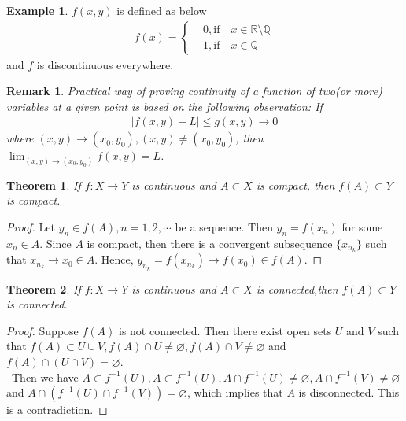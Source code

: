 \documentclass[12pt,leqno]{amsart}
\newtheorem{theorem}{Theorem}[section]
\newtheorem{remark}{Remark}[section]
\theoremstyle{definition}
\newtheorem{example}{Example}[section]
\numberwithin{equation}{subsection}
\begin{document}
\begin{example}
$f(x,y)$ is defined as below
\begin{align*}
    f(x) = \left\{
    \begin{aligned}
    & 0, \text{if} \quad x \in \mathbb{R}\setminus\mathbb{Q} \\
    & 1, \text{if} \quad x \in \mathbb{Q}
    \end{aligned}
    \right.
\end{align*}
and $f$ is discontinuous everywhere.
\end{example}

\begin{remark}
Practical way of proving continuity of a function of two(or more) variables at a given point is based on the following observation: If
\begin{align*}
    |f(x,y) - L| \leq g(x,y)\rightarrow 0
\end{align*}
where $(x,y)\to(x_0,y_0), (x,y)\neq(x_0,y_0)$, then $\lim_{(x,y)\to(x_0,y_0)}f(x,y) = L$.
\end{remark}

\medskip

\begin{theorem}
If $f:X\to Y$ is continuous and $A\subset X$ is compact, then $f(A)\subset Y$ is compact.
\end{theorem}
\begin{proof}
Let $y_n\in f(A), n = 1,2,\cdots$ be a sequence. Then $y_n = f(x_n)$ for some $x_n\in A$. Since $A$ is compact, then there is a convergent subsequence $\{x_{n_k}\}$ such that $x_{n_k}\to x_0\in A$. Hence, $y_{n_k} = f(x_{n_k})\to f(x_0) \in f(A)$.
\end{proof}

\begin{theorem}
If $f:X\to Y$ is continuous and $A\subset X$ is connected,then $f(A)\subset Y$ is connected.
\end{theorem}
\begin{proof}
Suppose $f(A)$ is not connected. Then there exist open sets $U$ and $V$ such that $f(A)\subset U\cup V, f(A)\cap U\neq\varnothing, f(A)\cap V\neq\varnothing$ and $f(A)\cap (U\cap V)=\varnothing$. \\
\hspace*{1em}\, Then we have $A\subset f^{-1}(U), A\subset f^{-1}(U), A \cap f^{-1}(U)\neq\varnothing, A \cap f^{-1}(V)\neq\varnothing$ and $A\cap (f^{-1}(U)\cap f^{-1}(V))=\varnothing$, which implies that $A$ is disconnected. This is a contradiction.
\end{proof}
\end{document}
